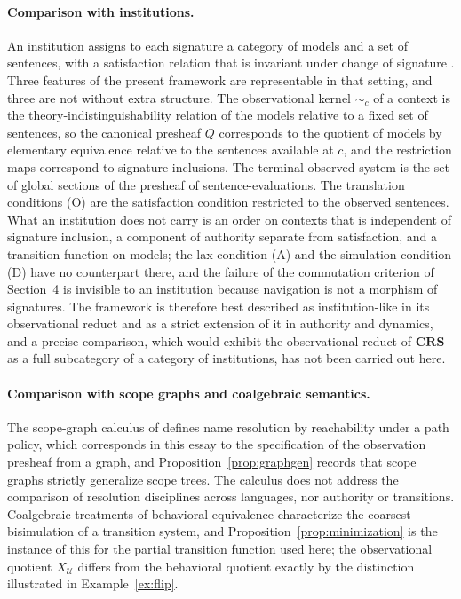 \documentclass[11pt]{article}
\theoremstyle{definition}
\theoremstyle{remark}
\newcommand{\cU}{\mathcal U}
\newcommand{\CRS}{\mathbf{CRS}}
\newcommand{\sk}{\sim}
\begin{document}
\paragraph{Comparison with institutions.} An institution assigns to each signature a category of models and a set of sentences, with a satisfaction relation that is invariant under change of signature \cite{goguen}. Three features of the present framework are representable in that setting, and three are not without extra structure. The observational kernel $\sk_c$ of a context is the theory-indistinguishability relation of the models relative to a fixed set of sentences, so the canonical presheaf $Q$ corresponds to the quotient of models by elementary equivalence relative to the sentences available at $c$, and the restriction maps correspond to signature inclusions. The terminal observed system is the set of global sections of the presheaf of sentence-evaluations. The translation conditions (O) are the satisfaction condition restricted to the observed sentences. What an institution does not carry is an order on contexts that is independent of signature inclusion, a component of authority separate from satisfaction, and a transition function on models; the lax condition (A) and the simulation condition (D) have no counterpart there, and the failure of the commutation criterion of Section~4 is invisible to an institution because navigation is not a morphism of signatures. The framework is therefore best described as institution-like in its observational reduct and as a strict extension of it in authority and dynamics, and a precise comparison, which would exhibit the observational reduct of $\CRS$ as a full subcategory of a category of institutions, has not been carried out here.

\paragraph{Comparison with scope graphs and coalgebraic semantics.} The scope-graph calculus of \cite{scopegraphs} defines name resolution by reachability under a path policy, which corresponds in this essay to the specification of the observation presheaf from a graph, and Proposition~\ref{prop:graphgen} records that scope graphs strictly generalize scope trees. The calculus does not address the comparison of resolution disciplines across languages, nor authority or transitions. Coalgebraic treatments of behavioral equivalence \cite{sangiorgi} characterize the coarsest bisimulation of a transition system, and Proposition~\ref{prop:minimization} is the instance of this for the partial transition function used here; the observational quotient $X_{\cU}$ differs from the behavioral quotient exactly by the distinction illustrated in Example~\ref{ex:flip}.
\end{document}
